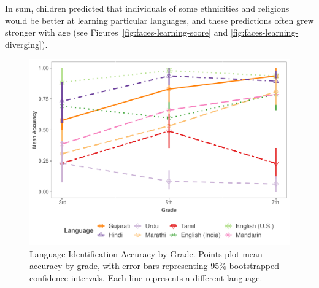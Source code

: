 \documentclass{foushee-adapted-preprint}
\begin{document}
In sum, children predicted that individuals of some ethnicities and religions would be better at learning particular languages, and these predictions often grew stronger with age (see Figures~\ref{fig:faces-learning-score} and \ref{fig:faces-learning-diverging}). 
\begin{figure}[h]
    \centering
    \includegraphics[width=\linewidth]{figures/std_plots/id_accuracy_std.png}
    \caption{Language Identification Accuracy by Grade. Points plot mean accuracy by grade, with error bars representing 95\% bootstrapped confidence intervals. Each line represents a different language.}
    \label{fig:lang-id-by-std}
\vspace{-7pt}
\end{figure}
\end{document}
